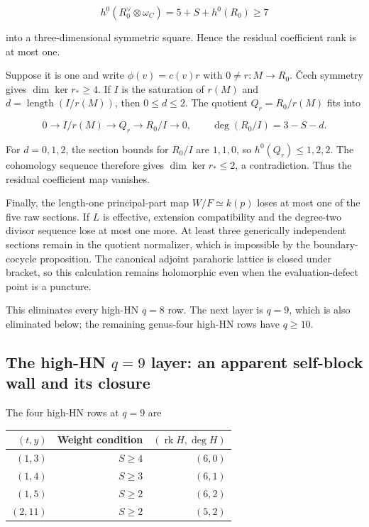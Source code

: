 \documentclass[11pt]{article}
\theoremstyle{definition}
\begin{document}
\[h^0(R_0^\vee\otimes\omega_C)=5+S+h^0(R_0)\ge7\]

into a three-dimensional symmetric square. Hence the residual
coefficient rank is at most one.

Suppose it is one and write \(\phi(v)=c(v)r\) with \(0\ne r:M\to R_0\).
\v{C}ech symmetry gives \(\dim\ker r_*\ge4\). If \(I\) is the saturation of
\(r(M)\) and \(d=\operatorname{length}(I/r(M))\), then \(0\le d\le2\).
The quotient \(Q_r=R_0/r(M)\) fits into

\[0\longrightarrow I/r(M)\longrightarrow Q_r
\longrightarrow R_0/I\longrightarrow0,
\qquad \deg(R_0/I)=3-S-d.\]

For \(d=0,1,2\), the section bounds for \(R_0/I\) are \(1,1,0\), so
\(h^0(Q_r)\le1,2,2\). The cohomology sequence therefore gives
\(\dim\ker r_*\le2\), a contradiction. Thus the residual coefficient map
vanishes.

Finally, the length-one principal-part map \(W/F\simeq k(p)\) loses at
most one of the five raw sections. If \(L\) is effective, extension
compatibility and the degree-two divisor sequence lose at most one more.
At least three generically independent sections remain in the quotient
normalizer, which is impossible by the boundary-cocycle proposition. The
canonical adjoint parahoric lattice is closed under bracket, so this
calculation remains holomorphic even when the evaluation-defect point is
a puncture.

This eliminates every high-HN \(q=8\) row. The next layer is \(q=9\),
which is also eliminated below; the remaining genus-four high-HN rows
have \(q\ge10\).

\subsection{\texorpdfstring{The high-HN \(q=9\) layer: an apparent
self-block wall and its
closure}{The high-HN q=9 layer: an apparent self-block wall and its closure}}\label{the-high-hn-q9-layer-an-apparent-self-block-wall-and-its-closure}

The four high-HN rows at \(q=9\) are

\begin{longtable}[]{@{}rrr@{}}
\toprule\noalign{}
\((t,y)\) & Weight condition & \((\operatorname{rk}H,\deg H)\) \\
\midrule\noalign{}
\endhead
\bottomrule\noalign{}
\endlastfoot
\((1,3)\) & \(S\ge4\) & \((6,0)\) \\
\((1,4)\) & \(S\ge3\) & \((6,1)\) \\
\((1,5)\) & \(S\ge2\) & \((6,2)\) \\
\((2,11)\) & \(S\ge2\) & \((5,2)\) \\
\end{longtable}
\end{document}
